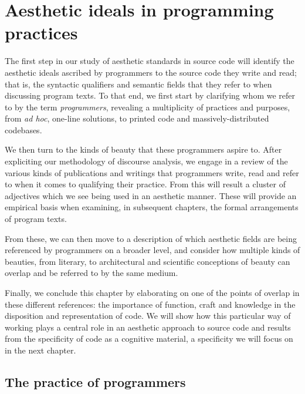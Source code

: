 \chapter{Aesthetic ideals in programming practices}
\label{chap:ideals}

The first step in our study of aesthetic standards in source code will identify the aesthetic ideals ascribed by programmers to the source code they write and read; that is, the syntactic qualifiers and semantic fields that they refer to when discussing program texts. To that end, we first start by clarifying whom we refer to by the term \emph{programmers}, revealing a multiplicity of practices and purposes, from \emph{ad hoc}, one-line solutions, to printed code and massively-distributed codebases.

We then turn to the kinds of beauty that these programmers aspire to. After expliciting our methodology of discourse analysis, we engage in a review of the various kinds of publications and writings that programmers write, read and refer to when it comes to qualifying their practice. From this will result a cluster of adjectives which we see being used in an aesthetic manner. These will provide an empirical basis when examining, in subsequent chapters, the formal arrangements of program texts.

From these, we can then move to a description of which aesthetic fields are being referenced by programmers on a broader level, and consider how multiple kinds of beauties, from literary, to architectural and scientific conceptions of beauty can overlap and be referred to by the same medium.

Finally, we conclude this chapter by elaborating on one of the points of overlap in these different references: the importance of function, craft and knowledge in the disposition and representation of code. We will show how this particular way of working  plays a central role in an aesthetic approach to source code and results from the specificity of code as a cognitive material, a specificity we will focus on in the next chapter.

\pagebreak

\section{The practice of programmers}
\label{sec:practice-programmers}

